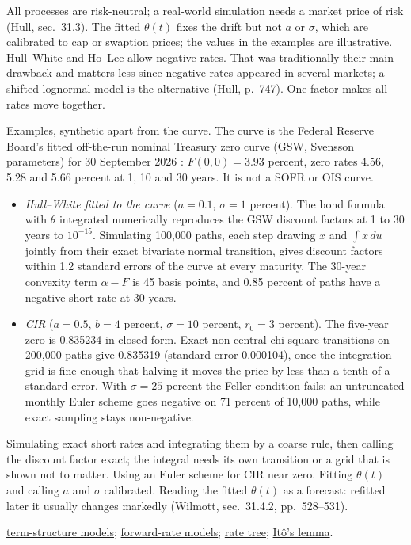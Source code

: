 \begin{qfmodel}
 All processes are risk-neutral; a real-world simulation needs a market price of risk (Hull, sec.~31.3). The fitted $\theta(t)$ fixes the drift but not $a$ or $\sigma$, which are calibrated to cap or swaption prices; the values in the examples are illustrative. Hull--White and Ho--Lee allow negative rates. That was traditionally their main drawback and matters less since negative rates appeared in several markets; a shifted lognormal model is the alternative (Hull, p.~747). One factor makes all rates move together.

 Examples, synthetic apart from the curve. The curve is the Federal Reserve Board's fitted off-the-run nominal Treasury zero curve (GSW, Svensson parameters) for 30 September 2026 \citep[\texttt{feds200628.csv}, BETA0--BETA3, TAU1 and TAU2 on 30 September 2026]{fed-gsw-data}: $F(0,0)=3.93$ percent, zero rates 4.56, 5.28 and 5.66 percent at 1, 10 and 30 years. It is not a SOFR or OIS curve.
\begin{itemize}
\item \emph{Hull--White fitted to the curve} ($a=0.1$, $\sigma=1$ percent). The bond formula with $\theta$ integrated numerically reproduces the GSW discount factors at 1 to 30 years to $10^{-15}$. Simulating 100{,}000 paths, each step drawing $x$ and $\int x\,du$ jointly from their exact bivariate normal transition, gives discount factors within 1.2 standard errors of the curve at every maturity. The 30-year convexity term $\alpha-F$ is 45 basis points, and 0.85 percent of paths have a negative short rate at 30 years.
\item \emph{CIR} ($a=0.5$, $b=4$ percent, $\sigma=10$ percent, $r_0=3$ percent). The five-year zero is 0.835234 in closed form. Exact non-central chi-square transitions on 200{,}000 paths give 0.835319 (standard error 0.000104), once the integration grid is fine enough that halving it moves the price by less than a tenth of a standard error. With $\sigma=25$ percent the Feller condition fails: an untruncated monthly Euler scheme goes negative on 71 percent of 10{,}000 paths, while exact sampling stays non-negative.
\end{itemize}

 Simulating exact short rates and integrating them by a coarse rule, then calling the discount factor exact; the integral needs its own transition or a grid that is shown not to matter. Using an Euler scheme for CIR near zero. Fitting $\theta(t)$ and calling $a$ and $\sigma$ calibrated. Reading the fitted $\theta(t)$ as a forecast: refitted later it usually changes markedly (Wilmott, sec.~31.4.2, pp.~528--531).

 \hyperref[mod:term-structure-models-simulation]{term-structure models}; \hyperref[mod:hjm-forward-rate-models]{forward-rate models}; \hyperref[meth:binomial-rate-tree-calibration]{rate tree}; \hyperref[res:ito-lemma-geometric-brownian-motion]{It\^o's lemma}.

\end{qfmodel}

